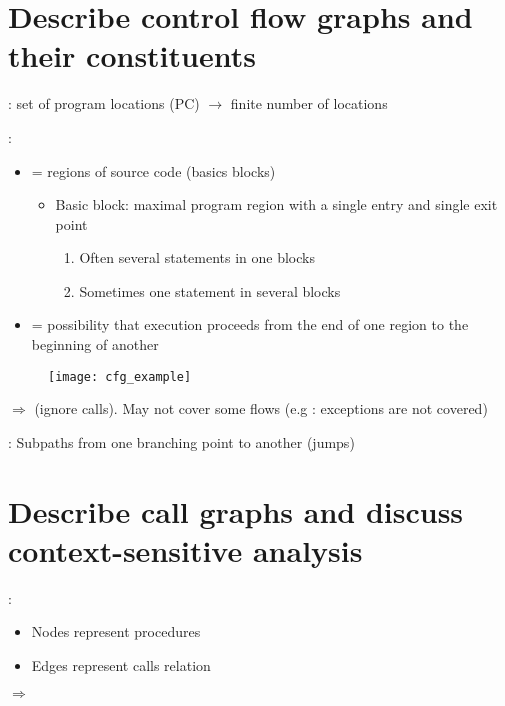 \section{Describe control flow graphs and their constituents}

 : set of program locations (PC) $\rightarrow$ finite number of locations

 :
\begin{itemize}
    \item {} = regions of source code (basics blocks)
    \begin{itemize}
        \item Basic block: maximal program region with a single entry and single exit point
        \begin{enumerate}
            \item Often several statements in one blocks
            \item Sometimes one statement in several blocks
        \end{enumerate}
    \end{itemize}
    \item {} = possibility that execution proceeds from the end of one region to the beginning of another
\end{itemize}

\begin{figure}[H]
    \centering
    \texttt{[image: cfg\_example]}
\end{figure}

$\Rightarrow$  (ignore calls). May not cover some flows (e.g : exceptions are not covered)

: Subpaths from one branching point to another (jumps)

\section{Describe call graphs and discuss context-sensitive analysis}

 : 
\begin{itemize}
    \item Nodes represent procedures
    \item Edges represent calls relation
\end{itemize}

$\Rightarrow$  


